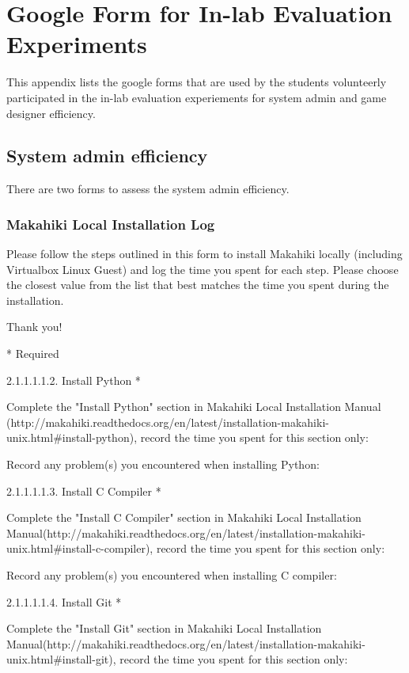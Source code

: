 \chapter{Google Form for In-lab Evaluation Experiments}
\label{app:googleform}

This appendix lists the google forms that are used by the students volunteerly participated in the in-lab evaluation experiements for system admin and game designer efficiency.

\section{System admin efficiency}
There are two forms to assess the system admin efficiency.

\subsection{Makahiki Local Installation Log}

\setlength{\parindent}{0pt}
\setlength{\parskip}{3mm}

Please follow the steps outlined in this form to install Makahiki locally (including Virtualbox Linux Guest) and log the time you spent for each step.
Please choose the closest value from the list that best matches the time you spent during the installation.

Thank you!

* Required

2.1.1.1.1.2. Install Python *

Complete the "Install Python" section in Makahiki Local Installation Manual (http://makahiki.readthedocs.org/en/latest/installation-makahiki-unix.html\#install-python), record the time you spent for this section only:

Record any problem(s) you encountered when installing Python:

2.1.1.1.1.3. Install C Compiler *

Complete the "Install C Compiler" section in Makahiki Local Installation Manual(http://makahiki.readthedocs.org/en/latest/installation-makahiki-unix.html\#install-c-compiler), record the time you spent for this section only:

Record any problem(s) you encountered when installing C compiler:

2.1.1.1.1.4. Install Git *

Complete the "Install Git" section in Makahiki Local Installation Manual(http://makahiki.readthedocs.org/en/latest/installation-makahiki-unix.html\#install-git), record the time you spent for this section only:

